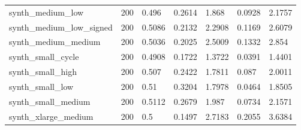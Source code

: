 \begin{table}[t]
\begin{tabular}{lllllll}
synth\_medium\_low & 200 & 0.496 & 0.2614 & 1.868 & 0.0928 & 2.1757 \\
synth\_medium\_low\_signed & 200 & 0.5086 & 0.2132 & 2.2908 & 0.1169 & 2.6079 \\
synth\_medium\_medium & 200 & 0.5036 & 0.2025 & 2.5009 & 0.1332 & 2.854 \\
synth\_small\_cycle & 200 & 0.4908 & 0.1722 & 1.3722 & 0.0391 & 1.4401 \\
synth\_small\_high & 200 & 0.507 & 0.2422 & 1.7811 & 0.087 & 2.0011 \\
synth\_small\_low & 200 & 0.51 & 0.3204 & 1.7978 & 0.0464 & 1.8505 \\
synth\_small\_medium & 200 & 0.5112 & 0.2679 & 1.987 & 0.0734 & 2.1571 \\
synth\_xlarge\_medium & 200 & 0.5 & 0.1497 & 2.7183 & 0.2055 & 3.6384 \\
\bottomrule
\end{tabular}
\end{table}
